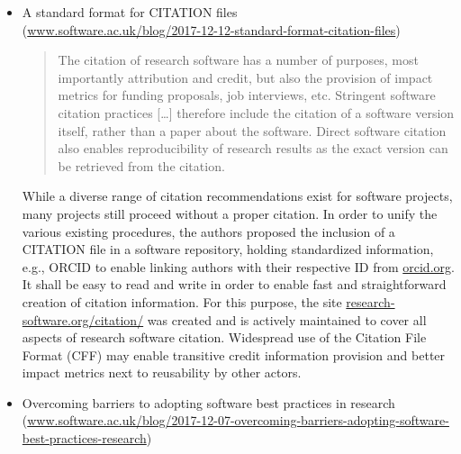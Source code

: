 \documentclass[11pt,letterpaper]{article}
\begin{document}
\begin{itemize}
\item A standard format for CITATION files\\(\href{https://www.software.ac.uk/blog/2017-12-12-standard-format-citation-files}{www.software.ac.uk/blog/2017-12-12-standard-format-citation-files})
\begin{quote}
The citation of research software has a number of purposes, most importantly attribution and credit, but also the provision of impact metrics for funding proposals, job interviews, etc. Stringent software citation practices [\ldots] therefore include the citation of a software version itself, rather than a paper about the software. Direct software citation also enables reproducibility of research results as the exact version can be retrieved from the citation. 
\end{quote}
While a diverse range of citation recommendations exist for software projects, many projects still proceed without a proper citation. In order to unify the various existing  procedures, the authors proposed the inclusion of a CITATION file in a software repository, holding standardized information, e.g., ORCID to enable linking authors with their respective ID from \href{https://orcid.org}{orcid.org}. It shall be easy to read and write in order to enable fast and straightforward creation of citation information. For this purpose, the site \href{https://research-software.org/citation/}{research-software.org/citation/} was created and is actively maintained to cover all aspects of research software citation. Widespread use of the Citation File Format (CFF) may enable transitive credit information provision and better impact metrics next to reusability by other actors.


\item Overcoming barriers to adopting software best practices in research (\href{https://www.software.ac.uk/blog/2017-12-07-overcoming-barriers-adopting-software-best-practices-research}{www.software.ac.uk/blog/2017-12-07-overcoming-barriers-adopting-software-best-practices-research})


\end{itemize}
\end{document}

